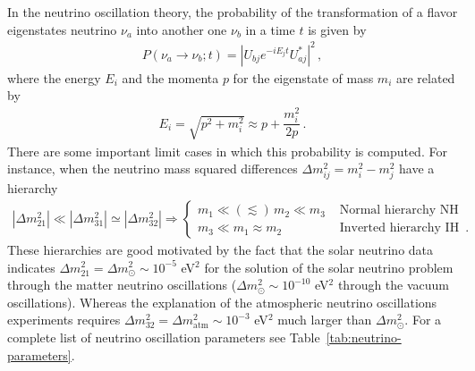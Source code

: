 In the neutrino oscillation theory, the probability of the transformation of a flavor eigenstates neutrino $\nu_{a}$ into another one $\nu_{b}$ in a time $t$ is given by~\cite{Akhmedov:1999uz}
%
\begin{align}
P(\nu_a \to \nu_b; t)=|U_{bj}e^{-iE_j t}U_{aj}^*|^2\,,
\end{align}
%
where the energy $E_i$ and the momenta $p$ for the eigenstate of mass $m_i$ are related by
\begin{align}
E_i=\sqrt{p^2+m_i^2}\approx p+\dfrac{m_i^2}{2p}\,.
\end{align}
%
There are some important limit cases in which this probability is computed. For instance, when the neutrino mass squared differences $\Delta m_{ij}^2=m_i^2-m_j^2$ have a hierarchy
%
\begin{align}
|\Delta m_{21}^2| \ll |\Delta m_{31}^2| \simeq |\Delta m_{32}^2|
\Rightarrow
\left\{
\begin{array}{ll}
 m_1 \ll (\lesssim)\, m_2 \ll m_3 & \text{ Normal hierarchy NH } \\
 m_3 \ll m_1 \approx m_2 & \text{ Inverted  hierarchy IH }\,.
\end{array}
\right. 
\end{align}
%
These hierarchies are good motivated by the fact that the solar neutrino data indicates $\Delta m_{21}^2 =\Delta m_{\odot}^2 \sim 10^{-5}$ eV$^2$ for the solution of the solar neutrino problem through the matter neutrino oscillations ($\Delta m_{\odot}^2 \sim 10^{-10}$ eV$^2$ through the vacuum oscillations).  Whereas the explanation of the atmospheric neutrino oscillations experiments requires $\Delta m_{32}^2 =\Delta m_{\text{atm}}^2 \sim 10^{-3}$ eV$^2$ much larger than  $\Delta m_{\odot}^2$. For a complete list of neutrino oscillation parameters see Table~\ref{tab:neutrino-parameters}.

